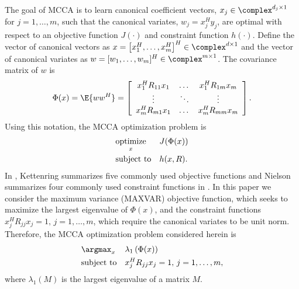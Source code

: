 The goal of MCCA is to learn canonical coefficient vectors, $x_j\in\complex^{d_j\times 1}$
for $j=1,\dots,m$, such that the canonical variates, $w_j=x_j^Hy_j$, are optimal with
respect to an objective function $J(\cdot)$ and constraint function $h(\cdot)$. Define the
vector of canonical vectors as
$x=\left[x_1^H,\dots,x_m^H\right]^H\in\complex^{d\times 1}$ and the vector of canonical
variates as $w=[w_1,\dots,w_m]^H\in\complex^{m\times 1}$. The covariance matrix of $w$ is
\begin{equation*}
\Phi(x)=\E{ww^H}=\left[\begin{array}{ccc} x_1^HR_{11}x_1 & \dots & x_1^HR_{1m}x_m \\ \vdots
    & \ddots & \vdots \\ x_m^HR_{m1}x_1 & \dots & x_m^HR_{mm}x_m\\ \end{array}\right].
\end{equation*}
Using this notation, the MCCA optimization problem is
\begin{equation}\label{eq:chpt10:opt_prob}
\begin{aligned}
&\underset{x}{\mathop{\rm optimize}} && J(\Phi(x))\\
&\text{subject to} && h(x,R).\\
\end{aligned}
\end{equation}
In \cite{kettenring1971canonical}, Kettenring summarizes five commonly used objective
functions and Nielson summarizes four commonly used constraint functions in
\cite{nielsen1994analysis}. In this paper we consider the maximum variance (MAXVAR)
objective function, which seeks to maximize the largest eigenvalue of $\Phi(x)$, and the
constraint functions $x_j^HR_{jj}x_j = 1,\, j=1,\dots,m$,
which require the canonical variates to be unit norm. Therefore, the MCCA optimization
problem considered herein is
\begin{equation}\label{eq:chpt10:opt_prob2}
\begin{aligned}
&\argmax_x && \lambda_1\left(\Phi(x)\right)\\
&\text{subject to} && x_j^HR_{jj}x_j = 1,\, j=1,\dots,m,\\
\end{aligned}
\end{equation}
where $\lambda_1(M)$ is the largest eigenvalue of a matrix $M$.

